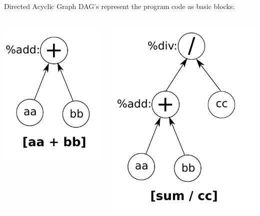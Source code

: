 \documentclass[]{beamer}
\begin{document}
\begin{frame}{Directed Acyclic Graph}
  DAG's represent the program code as basic blocks:
  \begin{columns}[b]
    \begin{column}{.5\textwidth}
    \begin{center}
      \includegraphics[width=.5\textwidth]{pictures/dag_step_1}
    \end{center}
    \end{column}
    \begin{column}{.5\textwidth}
      \begin{center}
      \includegraphics[width=.65\textwidth]{pictures/dag_step_2}

\end{center}
\end{column}
\end{columns}
\end{frame}
\end{document}
